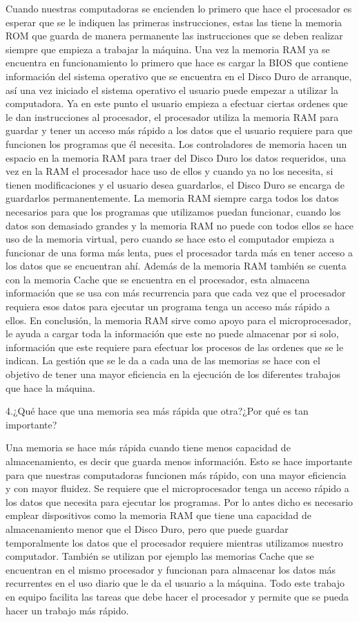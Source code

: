 \documentclass{article}
\begin{document}
Cuando nuestras computadoras se encienden lo primero que hace el procesador es esperar que se le indiquen las primeras instrucciones, estas las tiene la memoria ROM que guarda de manera permanente las instrucciones que se deben realizar siempre que empieza a trabajar la máquina. Una vez la memoria RAM ya se encuentra en funcionamiento lo primero que hace es cargar la BIOS que contiene información del sistema operativo que se encuentra en el Disco Duro de arranque, así una vez iniciado el sistema operativo el usuario puede empezar a utilizar la computadora. Ya en este punto el usuario empieza a efectuar ciertas ordenes que le dan instrucciones al procesador, el procesador utiliza la memoria RAM para guardar y tener un acceso más rápido a los datos que el usuario requiere para que funcionen los programas que él necesita. Los controladores de memoria hacen un espacio en la memoria RAM para traer del Disco Duro los datos requeridos, una vez en la RAM el procesador hace uso de ellos y cuando ya no los necesita, si tienen modificaciones y el usuario desea guardarlos, el Disco Duro se encarga de guardarlos permanentemente. La memoria RAM siempre carga todos los datos necesarios para que los programas que utilizamos puedan funcionar, cuando los datos son demasiado grandes y la memoria RAM no puede con todos ellos se hace uso de la memoria virtual, pero cuando se hace esto el computador empieza a funcionar de una forma más lenta, pues el procesador tarda más en tener acceso a los datos que se encuentran ahí. Además de la memoria RAM también se cuenta con la memoria Cache que se encuentra en el procesador, esta almacena información que se usa con más recurrencia para que cada vez que el procesador requiera esos datos para ejecutar un programa tenga un acceso más rápido a ellos. En conclusión, la memoria RAM sirve como apoyo para el microprocesador, le ayuda a cargar toda la información que este no puede almacenar por si solo, información que este requiere para efectuar los procesos de las ordenes que se le indican.  La gestión que se le da a cada una de las memorias se hace con el objetivo de tener una mayor eficiencia en la ejecución de los diferentes trabajos que hace la máquina.

4.¿Qué hace que una memoria sea más rápida que otra?¿Por qué es tan importante?

Una memoria se hace más rápida cuando tiene menos capacidad de almacenamiento, es decir que guarda menos información. Esto se hace importante para que nuestras computadoras funcionen más rápido, con una mayor eficiencia y con mayor fluidez. Se requiere que el microprocesador tenga un acceso rápido a los datos que necesita para ejecutar los programas. Por lo antes dicho es necesario emplear dispositivos como la memoria RAM que tiene una capacidad de almacenamiento menor que el Disco Duro, pero que puede guardar temporalmente los datos que el procesador requiere mientras utilizamos nuestro computador. También se utilizan por ejemplo las memorias Cache que se encuentran en el mismo procesador y funcionan para almacenar los datos más recurrentes en el uso diario que le da el usuario a la máquina. Todo este trabajo en equipo facilita las tareas que debe hacer el procesador y permite que se pueda hacer un trabajo más rápido.
\end{document}
